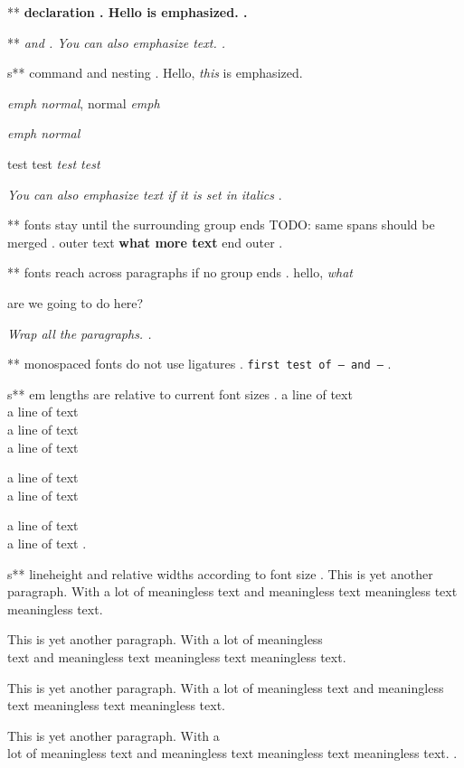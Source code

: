 ** \bfseries declaration
.
Hello \bfseries is emphasized.
.


** \em and \emph{}
.
\em You can also \emph{emphasize} text.
.


s** \emph{} command and nesting
.
Hello, \emph{this} is emphasized.

\emph{emph \textup{normal}}, \textup{normal \emph{emph}}

\emph{emph \emph{normal}}

test {test \em\em\em test \em test}

\textit{You can also \emph{emphasize} text if it is set in italics}
.


** fonts stay until the surrounding group ends      TODO: same spans should be merged
.
outer { text \bfseries {what} more text } end outer
.


** fonts reach across paragraphs if no group ends
.
hello, \itshape what

are we going to do here?

\slshape
Wrap all the paragraphs.
.


** monospaced fonts do not use ligatures
.
\texttt{first test of -- and ---}
.


s** em lengths are relative to current font sizes
.
\small
a line of text\\[1em]
a line of text\\[1em]
\Huge
a line of text\\[1em]
a line of text

\small
a line of text\\[1em]
a line of text

\Huge
a line of text\\[1em]
a line of text
.


s** lineheight and relative widths according to font size
.
This is yet another paragraph. With a lot of meaningless text and meaningless text meaningless text meaningless text.

\tiny This is yet another paragraph.  With a lot of meaningless\\[1em] text and meaningless text meaningless text meaningless text.

This is yet another \Large paragraph. With a lot of meaningless text and meaningless text meaningless text meaningless text.

This is yet another paragraph. With a\\[1em] lot of meaningless text and meaningless text meaningless text meaningless text.
.
